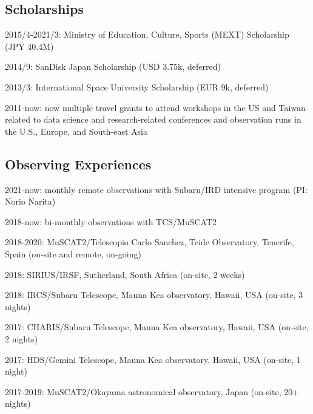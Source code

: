\documentclass[12pt,letterpaper]{article}
\begin{document}
\fi

\subsection{Scholarships}
\begin{list}{}{\cvlist}
    \item 2015/4-2021/3: Ministry of Education, Culture, Sports (MEXT) Scholarship (JPY 40.4M)
    \item 2014/9: SanDisk Japan Scholarship (USD 3.75k, deferred)
    \item 2013/3: International Space University Scholarship (EUR 9k, deferred)
    \item 2011-now: now multiple travel grants to attend workshops in the US and Taiwan related to data science and research-related conferences and observation runs in the U.S., Europe, and South-east Asia
\end{list}

\subsection{Observing Experiences}
\begin{list}{}{\cvlist}
    \item 2021-now: monthly remote observations with Subaru/IRD intensive program (PI: Norio Narita) 
    \item 2018-now: bi-monthly observations with TCS/MuSCAT2
    \item 2018-2020: MuSCAT2/Telescopio Carlo Sanchez, Teide Observatory, Tenerife, Spain (on-site and remote, on-going)
    \item 2018: SIRIUS/IRSF, Sutherland, South Africa (on-site, 2 weeks)
    \item 2018: IRCS/Subaru Telescope, Mauna Kea observatory, Hawaii, USA (on-site, 3 nights)
    \item 2017: CHARIS/Subaru Telescope, Mauna Kea observatory, Hawaii, USA (on-site, 2 nights)
    \item 2017: HDS/Gemini Telescope, Mauna Kea observatory, Hawaii, USA (on-site, 1 night)
    \item 2017-2019: MuSCAT2/Okayama astronomical observatory, Japan (on-site, 20+ nights)
\end{list}
\end{document}
